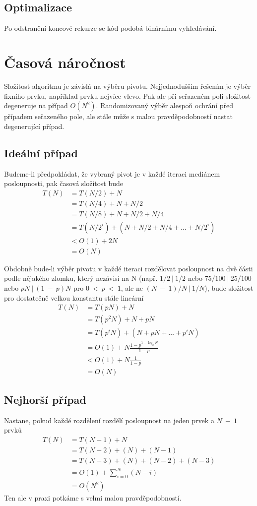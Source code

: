 \documentclass[11pt]{article}
\begin{document}
\subsection{Optimalizace}
Po odstranění koncové rekurze se kód podobá binárnímu vyhledávání.



\section{Časová náročnost}
Složitost algoritmu je závislá na výběru pivotu. Nejjednodušším řešením je
výběr fixního prvku, například prvku nejvíce vlevo. Pak ale při seřazeném poli 
složitost degeneruje na případ $O(N^2)$. Randomizovaný výběr alespoň ochrání 
před případem seřazeného pole, ale stále může s malou pravděpodobností nastat 
degenerující případ.

\subsection{Ideální případ}
Budeme-li předpokládat, že vybraný pivot je v každé iteraci mediánem posloupnosti, pak časová složitost bude
\begin{align*}
T(N) &= T(N/2) + N \\
&= T(N/4) + N + N/2 \\
&= T(N/8) + N + N/2 + N/4 \\
&= T(N/2^i) + (N + N/2 + N/4 + \ldots + N/2^i) \\
&< O(1) + 2N \\
&= O(N)
\end{align*}

Obdobně bude-li výběr pivotu v každé iteraci rozdělovat posloupnost na dvě části
podle nějakého zlomku, který nezávisí na N (např. $1/2~|~1/2$ nebo 
$75/100~|~25/100$ nebo $pN~|~(1~-~p)N$ pro $0~<~p~<~1$, 
ale ne $(N~-~1)/N~|~1/N$), bude složitost pro dostatečně velkou konstantu 
stále lineární
\begin{align*}
T(N) &= T(pN) + N \\
&= T(p^2 N) + N + p N \\
&= T(p^i N) + (N + p N + \ldots + p^i N) \\
&= O(1) + N \frac{1 - p^{1 - \log _p N}}{1 - p} \\
&< O(1) + N \frac{1}{1 - p} \\
&= O(N)
\end{align*}

\subsection{Nejhorší případ}
Nastane, pokud každé rozdělení rozdělí posloupnost na jeden prvek a $N~-~1$
prvků
\begin{align*}
T(N) &= T(N - 1) + N \\
&= T(N - 2) + (N) + (N - 1) \\
&= T(N - 3) + (N) + (N - 2) + (N - 3) \\
&= O(1) + \displaystyle\sum\limits_{i = 0}^{N} (N - i) \\
&= O(N^2)
\end{align*}
Ten ale v praxi potkáme s velmi malou pravděpodobností.
\end{document}
